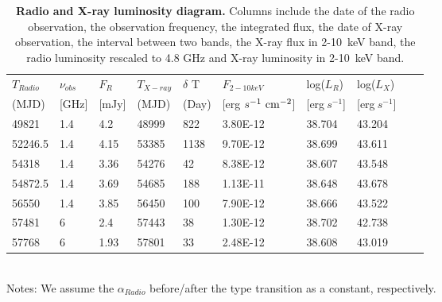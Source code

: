 \begin{table}
\centering
\caption{{\bf Radio and X-ray luminosity diagram.} Columns include the date of the radio observation, the observation frequency, the integrated flux, the date of X-ray observation, the interval between two bands, the X-ray flux in 2-10~keV band, the radio luminosity rescaled to 4.8 GHz and X-ray luminosity in 2-10~keV band.}
\label{tab:table4}
\begin{tabular}{lllllllllr}
\hline
\hline

$T_{Radio}$ & $\nu_{obs}$ & $F_{R}$ & $T_{X-ray}$ & $\delta$ T & $F_{2-10keV}$ & log($L_{R}$) &log($L_{X}$) \\ 
(MJD) & [GHz]& [mJy]& (MJD)  &(Day)  &[erg$~s^{-1}~\rm{cm}^{-2}$] & [erg$~s^{-1}$] &[erg$~s^{-1}$] \\
\hline
    49821 & 1.4   & 4.2   & 48999 & 822   & 3.80E-12 & 38.704 & 43.204 \\
    52246.5 & 1.4   & 4.15  & 53385 & 1138  & 9.70E-12 & 38.699 & 43.611 \\
    54318 & 1.4   & 3.36  & 54276 & 42    & 8.38E-12 & 38.607 & 43.548 \\
    54872.5 & 1.4   & 3.69  & 54685 & 188   & 1.13E-11 & 38.648 & 43.678 \\
    56550 & 1.4   & 3.85  & 56450 & 100   & 7.90E-12 & 38.666 & 43.522 \\
    57481 & 6     & 2.4   & 57443 & 38    & 1.30E-12 & 38.702 & 42.738 \\
    57768 & 6     & 1.93  & 57801 & 33    & 2.48E-12 & 38.608 & 43.019 \\

 \hline
\end{tabular}\\
Notes: We assume the $\alpha_{Radio}$ before/after the type transition as a constant, respectively. 
\end{table}